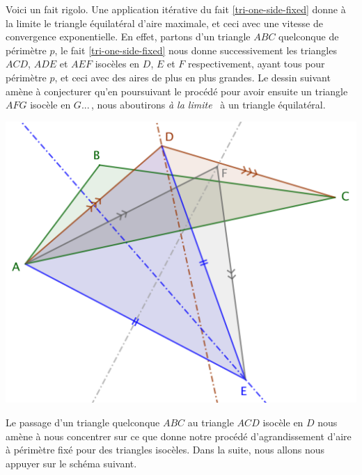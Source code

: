 \begin{remark}
	Voici un fait rigolo. Une application itérative du fait \ref{tri-one-side-fixed} donne à la limite le triangle équilatéral d'aire maximale, et ceci avec une vitesse de convergence exponentielle.
	En effet, partons d'un triangle $ABC$ quelconque de périmètre $p$, le fait \ref{tri-one-side-fixed} nous donne successivement les triangles $ACD$, $ADE$ et $AEF$ isocèles en $D$, $E$ et $F$ respectivement, ayant tous pour périmètre $p$, et ceci avec des aires de plus en plus grandes.  
	Le dessin suivant amène à conjecturer qu'en poursuivant le procédé pour avoir ensuite un triangle $AFG$ isocèle en $G$...\,, nous aboutirons \og \emph{à la limite} \fg\ à un triangle équilatéral.

	\begin{center}
		\includegraphics[scale=.4]{content/triangle-gene/triangle-conj.png}
	\end{center} 

	
	Le passage d'un triangle quelconque $ABC$ au triangle $ACD$ isocèle en $D$ nous amène à nous concentrer sur ce que donne notre procédé d'agrandissement d'aire à périmètre fixé pour des triangles isocèles. 
	Dans la suite, nous allons nous appuyer sur le schéma suivant.
	

\end{remark}
